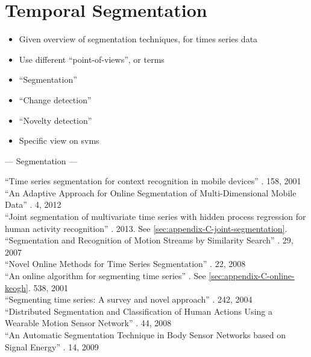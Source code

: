 \section{Temporal Segmentation}\label{sec:temporal_segmentation}

\begin{itemize}
  \item Given overview of segmentation techniques, for times series data
  \item Use different ``point-of-views'', or terms
  \item ``Segmentation''
  \item ``Change detection''
  \item ``Novelty detection''
  \item Specific view on \gls{svm}s
\end{itemize}


--- Segmentation ---

``Time series segmentation for context recognition in mobile devices'' \cite{himberg2001time}. 158, 2001 \\

``An Adaptive Approach for Online Segmentation of Multi-Dimensional Mobile Data'' \cite{guo2012adaptive}. 4, 2012 \\

``Joint segmentation of multivariate time series with hidden process regression for human activity recognition'' \cite{chamroukhi2013joint}. 2013. See \ref{sec:appendix-C-joint-segmentation}. \\

``Segmentation and Recognition of Motion Streams by Similarity Search'' \cite{li2007segmentation}. 29, 2007 \\

``Novel Online Methods for Time Series Segmentation'' \cite{liu2008novel}. 22, 2008 \\

``An online algorithm for segmenting time series'' \cite{keogh2001online}. See \ref{sec:appendix-C-online-keogh}. 538, 2001 \\
``Segmenting time series: A survey and novel approach'' \cite{keogh2004segmenting}. 242, 2004 \\

``Distributed Segmentation and Classification of Human Actions Using a Wearable Motion Sensor Network'' \cite{yang2008distributed}. 44, 2008 \\

``An Automatic Segmentation Technique in Body Sensor Networks based on Signal Energy'' \cite{guenterberg2009automatic}. 14, 2009 \\

